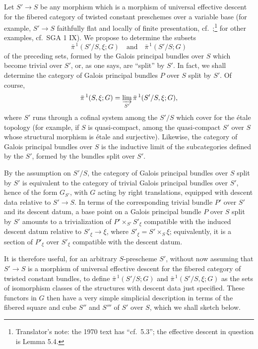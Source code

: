 Let \(S'\to S\) be any morphism which is a morphism of universal effective
descent for the fibered category of twisted constant preschemes over a
variable base (for example, \(S'\to S\) faithfully flat and locally of
finite presentation, cf.\ ;\footnote{Translator's note: the 1970
text has ``cf.\ 5.3''; the effective descent in question is Lemma 5.4.} for
other examples, cf.\ SGA 1 IX). We
propose to determine the subsets
\[
  \bar\pi^{\,1}(S'/S,\xi;G)
  \quad\text{and}\quad
  \bar\pi^{\,1}(S'/S;G)
\]
of the preceding sets, formed by the Galois principal bundles over \(S\)
which become trivial over \(S'\), or, as one says, are ``split'' by \(S'\).
In fact, we shall determine the category of Galois principal bundles \(P\)
over \(S\) split by \(S'\). Of course,
\[
  \bar\pi^{\,1}(S,\xi;G)
  =
  \varinjlim_{S'}\bar\pi^{\,1}(S'/S,\xi;G),
\]
where \(S'\) runs through a cofinal system among the \(S'/S\) which cover
for the étale topology (for example, if \(S\) is quasi-compact, among the
quasi-compact \(S'\) over \(S\) whose structural morphism is étale and
surjective). Likewise, the category of Galois principal bundles over \(S\)
is the inductive limit of the subcategories defined by the \(S'\), formed
by the bundles split over \(S'\).

By the assumption on \(S'/S\), the category of Galois principal bundles
over \(S\) split by \(S'\) is equivalent to the category of trivial Galois
principal bundles over \(S'\), hence of the form \(G_{S'}\), with \(G\)
acting by right translations, equipped with descent data relative to
\(S'\to S\). In terms of the corresponding trivial bundle \(P'\) over
\(S'\) and its descent datum, a base point on a Galois principal bundle
\(P\) over \(S\) split by \(S'\) amounts to a trivialization of
\(P'\times_{S'}S'_\xi\) compatible with the induced descent datum relative
to \(S'_\xi\to\xi\), where \(S'_\xi=S'\times_S\xi\); equivalently, it is a
section of \(P'_\xi\) over \(S'_\xi\) compatible with the
descent datum.

It is therefore useful, for an arbitrary \(S\)-prescheme \(S'\), without
now assuming that \(S'\to S\) is a morphism of universal effective descent
for the fibered category of twisted constant bundles, to define
\(\bar\pi^{\,1}(S'/S;G)\) and
\(\bar\pi^{\,1}(S'/S,\xi;G)\) as the sets of isomorphism classes of the
structures with descent data just specified. These functors in \(G\) then
have a very simple simplicial description in terms of the fibered square
and cube \(S''\) and \(S'''\) of \(S'\) over \(S\), which we shall sketch
below.

